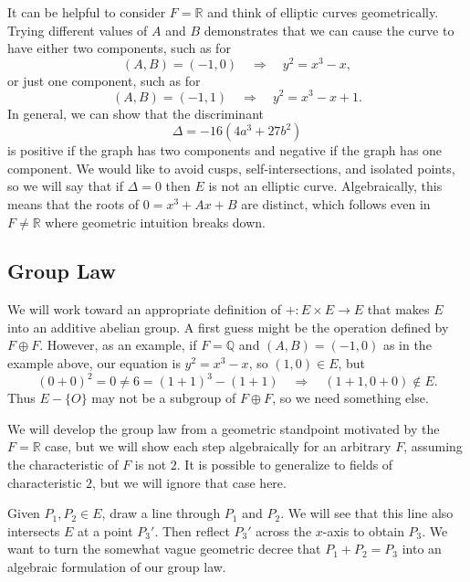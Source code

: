 \documentclass[12pt]{article}
\newcommand*\Q{\mathbb{Q}}
\newcommand*\R{\mathbb{R}}
\newcommand*\cross{\times}
\newcommand*\dsum{\oplus}
\renewcommand*\implies{\Rightarrow}
\begin{document}
It can be helpful to consider $F = \R$ and think of elliptic curves
geometrically.\cite{desmos} Trying different values of $A$ and $B$ demonstrates
that we can cause the curve to have either two components, such as for
\[ (A, B) = (-1, 0) \quad\implies\quad y^2 = x^3 - x, \]
or just one component, such as for
\[ (A, B) = (-1, 1) \quad\implies\quad y^2 = x^3 - x + 1. \]
In general, we can show that the discriminant
\[ \Delta = -16(4a^3 + 27b^2) \]
is positive if the graph has two components and negative if the graph has one
component. We would like to avoid cusps, self-intersections, and isolated
points, so we will say that if $\Delta = 0$ then $E$ is not an elliptic curve.
Algebraically, this means that the roots of $0 = x^3 + Ax + B$ are distinct,
which follows even in $F \neq \R$ where geometric intuition breaks down.

\subsection{Group Law}

We will work toward an appropriate definition of $+ : E \cross E \to E$ that
makes $E$ into an additive abelian group. A first guess might be the operation
defined by $F \dsum F$. However, as an example, if $F = \Q$ and $(A, B) = (-1,
0)$ as in the example above, our equation is $y^2 = x^3 - x$, so $(1, 0) \in E$,
but
\[
  (0 + 0)^2 = 0 \neq 6 = (1 + 1)^3 - (1 + 1)
  \quad\implies\quad (1 + 1, 0 + 0) \notin E.
\]
Thus $E - \{O\}$ may not be a subgroup of $F \dsum F$, so we need something
else.

We will develop the group law from a geometric standpoint motivated by the $F =
\R$ case, but we will show each step algebraically for an arbitrary $F$,
assuming the characteristic of $F$ is not $2$. It is possible to generalize to
fields of characteristic $2$, but we will ignore that case here.\cite{book}

Given $P_1, P_2 \in E$, draw a line through $P_1$ and $P_2$. We will see that
this line also intersects $E$ at a point $P_3'$. Then reflect $P_3'$ across the
$x$-axis to obtain $P_3$. We want to turn the somewhat vague geometric decree
that $P_1 + P_2 = P_3$ into an algebraic formulation of our group law.
\end{document}

